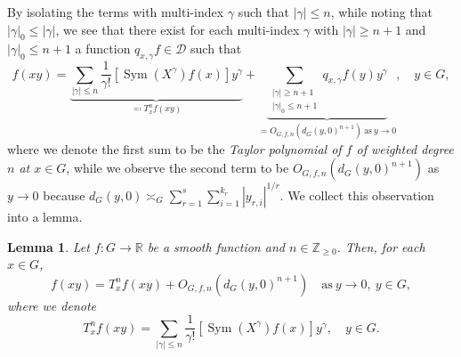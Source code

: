 \documentclass[11pt,reqno]{amsart}
\newtheorem{lemma}[theorem]{Lemma}
\newcommand{\1}{\mathbf 1}
\begin{document}
By isolating the terms with multi-index $\gamma$ such that $\left|\gamma\right|\le n$, while noting that $\left|\gamma\right|_0\le \left|\gamma\right|$, we see that there exist for each multi-index $\gamma$ with $\left|\gamma\right|\ge n+1$ and $\left|\gamma\right|_0\le n+1$ a function $q_{x,\gamma}f\in \mathcal{D}$ such that
\begin{equation}\label{eq:Taylor_local}
f\left(xy\right)=\underbrace{\sum_{\left|\gamma\right|\le n}\frac{1}{\gamma !}\left[\operatorname{Sym}\left(X^\gamma\right)f\left(x\right)\right]y^\gamma}_{\eqqcolon T^n_xf\left(xy\right)} + \underbrace{\sum_{\substack{\left|\gamma\right|\ge n+1 \\ \left|\gamma\right|_0\le n+1}}q_{x,\gamma}f\left(y\right)y^\gamma}_{=O_{G,f,n}\left(d_G\left(y,0\right)^{n+1}\right)\mathrm{~as~}y\to 0},\quad y\in G,
\end{equation}
where we denote the first sum to be the \emph{Taylor polynomial of $f$ of weighted degree $n$ at $x\in G$}, while we observe the second term to be $O_{G,f,n}\left(d_G\left(y,0\right)^{n+1}\right)$ as $y\to 0$ because $d_G\left(y,0\right)\asymp_G \sum_{r=1}^s\sum_{i=1}^{k_r}\left|y_{r,i}\right|^{1/r}$. We collect this observation into a lemma.

\begin{lemma}\label{lem:taylor_thm}
    Let $f:G\to\mathbb{R}$ be a smooth function and $n\in \mathbb{Z}_{\ge 0}$. Then, for each $x\in G$,
    \[
    f\left(xy\right)=T^n_xf\left(xy\right)+O_{G,f,n}\left(d_G\left(y,0\right)^{n+1}\right)\quad \mathrm{as~}y\to 0,~y\in G,
    \]
    where we denote
    \begin{equation}\label{eq:Taylor_def}
    T^n_xf\left(xy\right)=\sum_{\left|\gamma\right|\le n}\frac{1}{\gamma !}\left[\operatorname{Sym}\left(X^\gamma\right)f\left(x\right)\right]y^\gamma,\quad y\in G.
    \end{equation}
\end{lemma}
\end{document}
